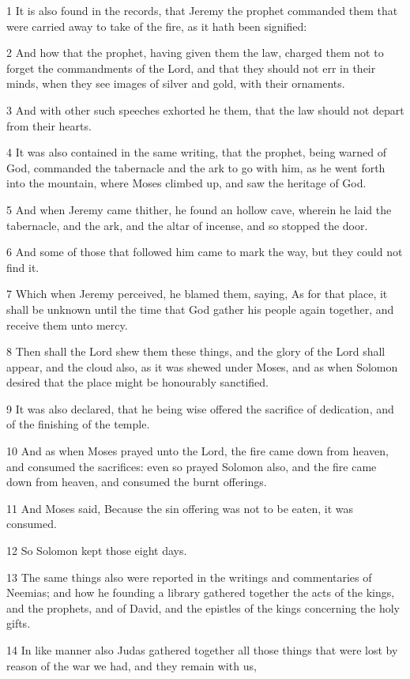 \par 1 It is also found in the records, that Jeremy the prophet commanded them that were carried away to take of the fire, as it hath been signified:
\par 2 And how that the prophet, having given them the law, charged them not to forget the commandments of the Lord, and that they should not err in their minds, when they see images of silver and gold, with their ornaments.
\par 3 And with other such speeches exhorted he them, that the law should not depart from their hearts.
\par 4 It was also contained in the same writing, that the prophet, being warned of God, commanded the tabernacle and the ark to go with him, as he went forth into the mountain, where Moses climbed up, and saw the heritage of God.
\par 5 And when Jeremy came thither, he found an hollow cave, wherein he laid the tabernacle, and the ark, and the altar of incense, and so stopped the door.
\par 6 And some of those that followed him came to mark the way, but they could not find it.
\par 7 Which when Jeremy perceived, he blamed them, saying, As for that place, it shall be unknown until the time that God gather his people again together, and receive them unto mercy.
\par 8 Then shall the Lord shew them these things, and the glory of the Lord shall appear, and the cloud also, as it was shewed under Moses, and as when Solomon desired that the place might be honourably sanctified.
\par 9 It was also declared, that he being wise offered the sacrifice of dedication, and of the finishing of the temple.
\par 10 And as when Moses prayed unto the Lord, the fire came down from heaven, and consumed the sacrifices: even so prayed Solomon also, and the fire came down from heaven, and consumed the burnt offerings.
\par 11 And Moses said, Because the sin offering was not to be eaten, it was consumed.
\par 12 So Solomon kept those eight days.
\par 13 The same things also were reported in the writings and commentaries of Neemias; and how he founding a library gathered together the acts of the kings, and the prophets, and of David, and the epistles of the kings concerning the holy gifts.
\par 14 In like manner also Judas gathered together all those things that were lost by reason of the war we had, and they remain with us,
